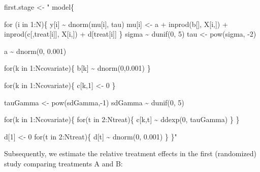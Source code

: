 \documentclass[
  letterpaper,
  DIV=11,
  numbers=noendperiod]{scrreprt}
\newenvironment{Shaded}{\begin{snugshade}}{\end{snugshade}}
\newcommand{\NormalTok}[1]{\textcolor[rgb]{0.00,0.23,0.31}{#1}}
\newcommand{\OtherTok}[1]{\textcolor[rgb]{0.00,0.23,0.31}{#1}}
\newcommand{\StringTok}[1]{\textcolor[rgb]{0.13,0.47,0.30}{#1}}
\begin{document}
\begin{Shaded}
\begin{Highlighting}[]
\NormalTok{first.stage }\OtherTok{\textless{}{-}} \StringTok{"}
\StringTok{model\{}

\StringTok{for (i in 1:N)\{}
\StringTok{    y[i] \textasciitilde{} dnorm(mu[i], tau)  }
\StringTok{    mu[i] \textless{}{-} a + inprod(b[], X[i,]) + inprod(c[,treat[i]], X[i,]) + d[treat[i]] }
\StringTok{\}}
\StringTok{sigma \textasciitilde{} dunif(0, 5)}
\StringTok{tau \textless{}{-} pow(sigma, {-}2)}

\StringTok{a \textasciitilde{} dnorm(0, 0.001)}

\StringTok{for(k in 1:Ncovariate)\{}
\StringTok{    b[k] \textasciitilde{} dnorm(0,0.001)}
\StringTok{\}}

\StringTok{for(k in 1:Ncovariate)\{}
\StringTok{    c[k,1] \textless{}{-} 0}
\StringTok{\}}

\StringTok{tauGamma \textless{}{-} pow(sdGamma,{-}1)}
\StringTok{sdGamma \textasciitilde{} dunif(0, 5)}

\StringTok{for(k in 1:Ncovariate)\{}
\StringTok{    for(t in 2:Ntreat)\{}
\StringTok{        c[k,t] \textasciitilde{} ddexp(0, tauGamma)}
\StringTok{    \}}
\StringTok{\}}

\StringTok{d[1] \textless{}{-} 0}
\StringTok{for(t in 2:Ntreat)\{}
\StringTok{    d[t] \textasciitilde{} dnorm(0, 0.001)}
\StringTok{\}}
\StringTok{\}"}
\end{Highlighting}
\end{Shaded}

Subsequently, we estimate the relative treatment effects in the first
(randomized) study comparing treatments A and B:
\end{document}
